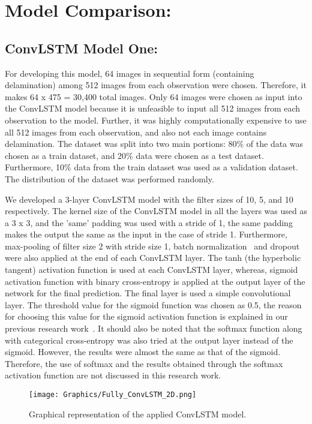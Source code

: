 \section{Model Comparison:}
\subsection{ConvLSTM Model One:}

For developing this model, 64 images in sequential form (containing delamination) among 512 images from each observation were chosen.
Therefore, it makes 64 x 475 = 30,400 total images.
Only 64 images were chosen as input into the ConvLSTM model because it is unfeasible to input all 512 images from each observation to the model.
Further, it was highly computationally expensive to use all 512 images from each observation, and also not each image contains delamination.
The dataset was split into two main portions: 80\% of the data was chosen as a train dataset, and 20\% data were chosen as a test dataset. 
Furthermore, 10\% data from the train dataset was used as a validation dataset.
The distribution of the dataset was performed randomly. 

We developed a 3-layer ConvLSTM model with the filter sizes of 10, 5, and 10 respectively.
The kernel size of the ConvLSTM model in all the layers was used as a 3 x 3, and the 'same' padding was used with a stride of 1, the same padding makes the output the same as the input in the case of stride 1.
Furthermore, max-pooling of filter size 2 with stride size 1, batch normalization~\cite{santurkar2018does} and dropout~\cite{srivastava2014dropout} were also applied at the end of each ConvLSTM layer.  
The tanh (the hyperbolic tangent) activation function is used at each ConvLSTM layer, whereas, sigmoid activation function with binary cross-entropy is applied at the output layer of the network for the final prediction.
The final layer is used a simple convolutional layer.
The threshold value for the sigmoid function was chosen as 0.5, the reason for choosing this value for the sigmoid activation function is explained in our previous research work~\cite{ijjeh2021full}.
It should also be noted that the softmax function along with categorical cross-entropy was also tried at the output layer instead of the sigmoid. 
However, the results were almost the same as that of the sigmoid.
Therefore, the use of softmax and the results obtained through the softmax activation function are not discussed in this research work.
\begin{figure} [h!]
	\begin{center}
		\texttt{[image: Graphics/Fully\_ConvLSTM\_2D.png]}
	\end{center}
	\caption{Graphical representation of the applied ConvLSTM model.} 
	\label{fig:model_one}
\end{figure}

